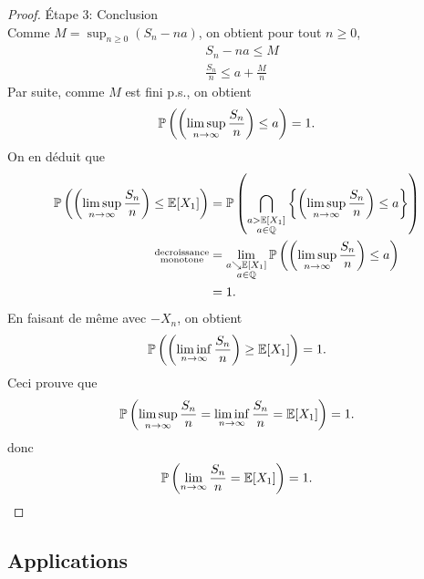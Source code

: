 \begin{proof}
    \ptr{} \'Etape 3: Conclusion\\
    Comme \(M = \sup_{n\geq 0} (S_n - na)\), on obtient pour
    tout \(n\geq 0\),
    \begin{equation*}
        \begin{aligned}
            & S_n - na \leq M\\
            & \frac{S_n}{n} \leq a + \frac{M}{n}
        \end{aligned}
    \end{equation*}
    Par suite, comme \(M\) est fini p.s., on obtient
    \begin{equation*}
        \mathbb{P}\left(\left(\limsup_{n\to\infty} \frac{S_n}{n}\right) \leq a\right) = 1.
    \end{equation*}
    On en déduit que
    \begin{equation*}
        \begin{aligned}
            \mathbb{P}\left(\left(\limsup_{n\to\infty} \frac{S_n}{n}\right) \leq \mathbb{E}[X_1]\right)
            &= \mathbb{P}\left(\bigcap_{\substack{a>\mathbb{E}[X_1]\\ a\in\mathbb{Q}}}\left\{\left(\limsup_{n\to\infty} \frac{S_n}{n}\right) \leq a\right\}\right)\\
            \substack{\text{\scriptsize{decroissance}}\\\text{\scriptsize{monotone}}}&= \lim_{\substack{a\searrow \mathbb{E}[X_1]\\ a\in\mathbb{Q}}} \mathbb{P}\left(\left(\limsup_{n\to\infty} \frac{S_n}{n}\right) \leq a\right)\\
            &= 1.
        \end{aligned}
    \end{equation*}
    En faisant de même avec \(-X_n\), on obtient
    \begin{equation*}
        \mathbb{P}\left(\left(\liminf_{n\to\infty} \frac{S_n}{n}\right) \geq \mathbb{E}[X_1]\right) = 1.
    \end{equation*}
    Ceci prouve que
    \begin{equation*}
        \mathbb{P}\left(\limsup_{n\to\infty} \frac{S_n}{n} = \liminf_{n\to\infty} \frac{S_n}{n} = \mathbb{E}[X_1]\right) = 1.
    \end{equation*}
    donc
    \begin{equation*}
        \mathbb{P}\left(\lim_{n\to\infty} \frac{S_n}{n} = \mathbb{E}[X_1]\right) = 1.
    \end{equation*}
\end{proof}

\subsection{Applications} %

